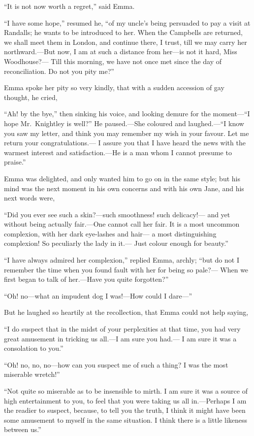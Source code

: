 ``It is not now worth a regret,'' said Emma.

``I have some hope,'' resumed he, ``of my uncle's being persuaded
to pay a visit at Randalls; he wants to be introduced to her.
When the Campbells are returned, we shall meet them in London,
and continue there, I trust, till we may carry her northward.---But now,
I am at such a distance from her---is not it hard, Miss Woodhouse?---%
Till this morning, we have not once met since the day of reconciliation.
Do not you pity me?''

Emma spoke her pity so very kindly, that with a sudden accession
of gay thought, he cried,

``Ah! by the bye,'' then sinking his voice, and looking demure for
the moment---``I hope Mr.\ Knightley is well?''  He paused.---She coloured
and laughed.---``I know you saw my letter, and think you may remember
my wish in your favour.  Let me return your congratulations.---%
I assure you that I have heard the news with the warmest interest
and satisfaction.---He is a man whom I cannot presume to praise.''

Emma was delighted, and only wanted him to go on in the same style;
but his mind was the next moment in his own concerns and with his
own Jane, and his next words were,

``Did you ever see such a skin?---such smoothness! such delicacy!---%
and yet without being actually fair.---One cannot call her fair.
It is a most uncommon complexion, with her dark eye-lashes and hair---%
a most distinguishing complexion!  So peculiarly the lady in it.---%
Just colour enough for beauty.''

``I have always admired her complexion,'' replied Emma, archly; ``but do not
I remember the time when you found fault with her for being so pale?---%
When we first began to talk of her.---Have you quite forgotten?''

``Oh! no---what an impudent dog I was!---How could I dare---''

But he laughed so heartily at the recollection, that Emma could
not help saying,

``I do suspect that in the midst of your perplexities at that time,
you had very great amusement in tricking us all.---I am sure you had.---%
I am sure it was a consolation to you.''

``Oh! no, no, no---how can you suspect me of such a thing?
I was the most miserable wretch!''

``Not quite so miserable as to be insensible to mirth.  I am sure it
was a source of high entertainment to you, to feel that you were taking
us all in.---Perhaps I am the readier to suspect, because, to tell
you the truth, I think it might have been some amusement to myself
in the same situation.  I think there is a little likeness between us.''

